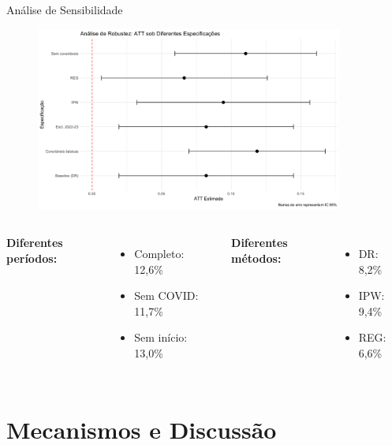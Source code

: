 \documentclass[10pt,aspectratio=169]{beamer}
\begin{document}
\begin{frame}{Análise de Sensibilidade}
\begin{figure}
\centering
\includegraphics[width=0.9\textwidth]{../../../data/outputs/robustness_plot.png}
\end{figure}

\begin{columns}
\textbf{Diferentes períodos:}
\begin{itemize}
    \item Completo: 12,6\%
    \item Sem COVID: 11,7\%
    \item Sem início: 13,0\%
\end{itemize}

\textbf{Diferentes métodos:}
\begin{itemize}
    \item DR: 8,2\%
    \item IPW: 9,4\%
    \item REG: 6,6\%
\end{itemize}
\end{columns}
\end{frame}

\section{Mecanismos e Discussão}
\end{document}
